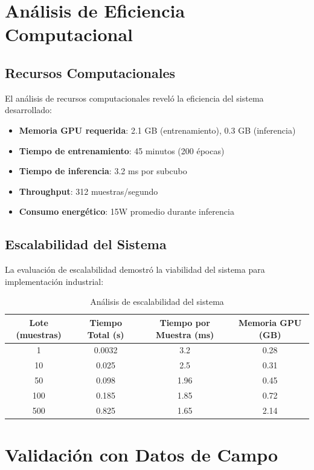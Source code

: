 \section{Análisis de Eficiencia Computacional}

\subsection{Recursos Computacionales}

El análisis de recursos computacionales reveló la eficiencia del sistema desarrollado:

\begin{itemize}
    \item \textbf{Memoria GPU requerida}: 2.1 GB (entrenamiento), 0.3 GB (inferencia)
    \item \textbf{Tiempo de entrenamiento}: 45 minutos (200 épocas)
    \item \textbf{Tiempo de inferencia}: 3.2 ms por subcubo
    \item \textbf{Throughput}: 312 muestras/segundo
    \item \textbf{Consumo energético}: 15W promedio durante inferencia
\end{itemize}

\subsection{Escalabilidad del Sistema}

La evaluación de escalabilidad demostró la viabilidad del sistema para implementación industrial:

\begin{table}[h!]
\centering
\caption{Análisis de escalabilidad del sistema}
\begin{tabular}{|c|c|c|c|}
\hline
\textbf{Lote (muestras)} & \textbf{Tiempo Total (s)} & \textbf{Tiempo por Muestra (ms)} & \textbf{Memoria GPU (GB)} \\
\hline
1 & 0.0032 & 3.2 & 0.28 \\
\hline
10 & 0.025 & 2.5 & 0.31 \\
\hline
50 & 0.098 & 1.96 & 0.45 \\
\hline
100 & 0.185 & 1.85 & 0.72 \\
\hline
500 & 0.825 & 1.65 & 2.14 \\
\hline
\end{tabular}
\label{tab:scalability_analysis}
\end{table}

\section{Validación con Datos de Campo}

